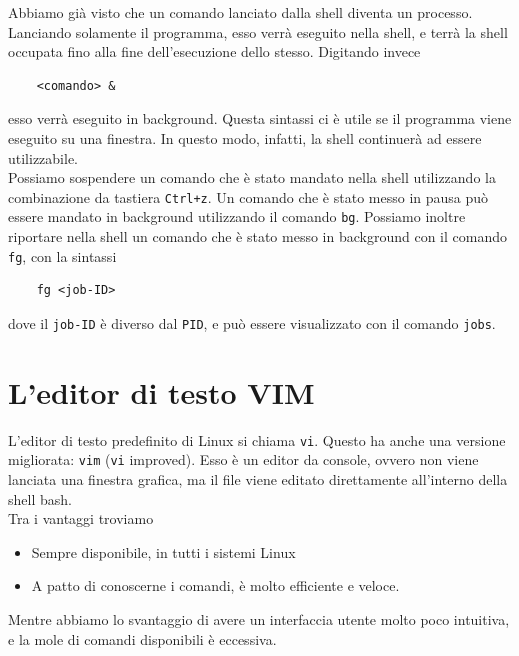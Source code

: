 \documentclass[11pt]{book}
\begin{document}
Abbiamo già visto che un comando lanciato dalla shell diventa un processo. Lanciando solamente il programma, esso verrà eseguito nella shell, e terrà la shell occupata fino alla fine dell'esecuzione dello stesso. Digitando invece
\begin{verbatim}
	<comando> &
\end{verbatim}
esso verrà eseguito in background. Questa sintassi ci è utile se il programma viene eseguito su una finestra. In questo modo, infatti, la shell continuerà ad essere utilizzabile. \\
Possiamo sospendere un comando che è stato mandato nella shell utilizzando la combinazione da tastiera \verb*|Ctrl+z|. Un comando che è stato messo in pausa può essere mandato in background utilizzando il comando \verb*|bg|. Possiamo inoltre riportare nella shell un comando che è stato messo in background con il comando \verb*|fg|, con la sintassi
\begin{verbatim}
	fg <job-ID>
\end{verbatim}
dove il \verb*|job-ID| è diverso dal \verb*|PID|, e può essere visualizzato con il comando \verb*|jobs|.

\chapter{L'editor di testo VIM}

L'editor di testo predefinito di Linux si chiama \verb*|vi|. Questo ha anche una versione migliorata: \verb*|vim| (\verb*|vi| improved). Esso è un editor da console, ovvero non viene lanciata una finestra grafica, ma il file viene editato direttamente all'interno della shell bash.\\
Tra i vantaggi troviamo
\begin{itemize}
	\item Sempre disponibile, in tutti i sistemi Linux 
	\item A patto di conoscerne i comandi, è molto efficiente e veloce.
\end{itemize}
Mentre abbiamo lo svantaggio di avere un interfaccia utente molto poco intuitiva, e la mole di comandi disponibili è eccessiva. 
\end{document}
